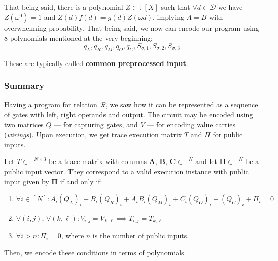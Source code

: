 \documentclass[../lecture-notes.tex]{subfiles}
\begin{document}
That being said, there is a polynomial $Z \in \mathbb{F}[X]$ such that $\forall
d \in \mathcal{D}$ we have $Z(\omega^{0}) = 1$ and $Z(d)f(d) = g(d)Z(\omega d)$,
implying $A = B$ with overwhelming probability. That being said, we now can
encode our program using 8 polynomials mentioned at the very beginning:
\[q_L, q_R, q_M, q_O, q_C, S_{\sigma,1}, S_{\sigma,2}, S_{\sigma,3}\]

These are typically called \textbf{common preprocessed input}.

\subsubsection{Summary}
Having a program for relation $\mathcal{R}$, we saw how it can be represented as
a sequence of gates with left, right operands and output. The circuit may be
encoded using two matrices $Q$ --- for capturing gates, and $V$ --- for encoding
value carries (\textit{wirings}). Upon execution, we get trace execution matrix
$T$ and $\Pi$ for public inputs.

\begin{definition}
Let $T \in \mathbb{F}^{N \times 3}$ be a trace matrix with columns $\mathbf{A}$,
$\mathbf{B}$, $\mathbf{C} \in \mathbb{F}^N$ and let $\boldsymbol{\Pi} \in
\mathbb{F}^N$ be a public input vector. They correspond to a valid execution
instance with public input given by $\boldsymbol{\Pi}$ if and only if:
\begin{enumerate}
    \item \(\forall i \in [N]: A_i(Q_{L})_i + B_i(Q_{R})_i + A_iB_i(Q_{M})_i + C_i(Q_{O})_i + (Q_{C})_i + \Pi_i = 0\)
    \item \(\forall (i, j), \, \forall (k, \ell): V_{i,j} = V_{k,\ell} \implies T_{i,j} = T_{k,\ell}\)
    \item \(\forall i > n: \Pi_i = 0\), where $n$ is the number of public inputs.
\end{enumerate}
\end{definition}

Then, we encode these conditions in terms of polynomials.
\end{document}
